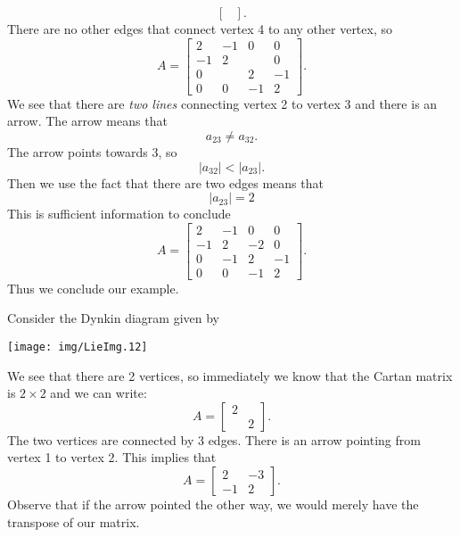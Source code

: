\begin{framed}
\begin{ex}
\begin{equation}
\begin{bmatrix}
\end{bmatrix}.
\end{equation}
There are no other edges that connect vertex 4 to any other
vertex, so 
\begin{equation}
A = \begin{bmatrix}
2 &-1 & 0 & 0 \\
-1& 2 &   & 0 \\
0 &   & 2 &-1 \\
0 & 0 &-1 & 2
\end{bmatrix}.
\end{equation}
We see that there are \emph{two lines} connecting vertex 2 to
vertex 3 and there is an arrow. The arrow means that
\begin{equation}
a_{23}\not=a_{32}.
\end{equation}
The arrow points towards 3, so
\begin{equation}
|a_{32}|<|a_{23}|.
\end{equation}
Then we use the fact that there are two edges means that
\begin{equation}
|a_{23}|=2
\end{equation}
This is sufficient information to conclude
\begin{equation}
A = \begin{bmatrix}
2 &-1 & 0 & 0 \\
-1& 2 &-2 & 0 \\
0 &-1 & 2 &-1 \\
0 & 0 &-1 & 2
\end{bmatrix}.
\end{equation}
Thus we conclude our example.
\end{ex}
\begin{ex}
Consider the Dynkin diagram given by
\begin{center}
  \texttt{[image: img/LieImg.12]}
\end{center}
We see that there are 2 vertices, so immediately we know that the
Cartan matrix is $2\times2$ and we can write:
\begin{equation}
A = \begin{bmatrix}
 2 &   \\
   & 2 
\end{bmatrix}.
\end{equation}
The two vertices are connected by 3 edges. There is an arrow
pointing from vertex 1 to vertex 2. This implies that
\begin{equation}
A = \begin{bmatrix}
 2 &-3 \\
-1 & 2 
\end{bmatrix}.
\end{equation}
Observe that if the arrow pointed the other way, we would merely
have the transpose of our matrix.
\end{ex}
\end{framed}

